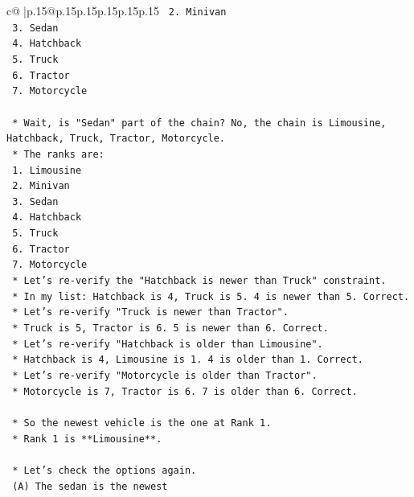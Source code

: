 \documentclass{article}
\begin{document}
{\begin{supertabular}{c@{$\;$}|p{.15\linewidth}@{}p{.15\linewidth}p{.15\linewidth}p{.15\linewidth}p{.15\linewidth}p{.15\linewidth}}
{{{\texttt{        2.  Minivan} \\
\texttt{        3.  Sedan} \\
\texttt{        4.  Hatchback} \\
\texttt{        5.  Truck} \\
\texttt{        6.  Tractor} \\
\texttt{        7.  Motorcycle} \\
\\ 
\texttt{    *   Wait, is "Sedan" part of the chain? No, the chain is Limousine, Hatchback, Truck, Tractor, Motorcycle.} \\
\texttt{    *   The ranks are:} \\
\texttt{        1. Limousine} \\
\texttt{        2. Minivan} \\
\texttt{        3. Sedan} \\
\texttt{        4. Hatchback} \\
\texttt{        5. Truck} \\
\texttt{        6. Tractor} \\
\texttt{        7. Motorcycle} \\
\texttt{    *   Let's re{-}verify the "Hatchback is newer than Truck" constraint.} \\
\texttt{        *   In my list: Hatchback is 4, Truck is 5. 4 is newer than 5. Correct.} \\
\texttt{    *   Let's re{-}verify "Truck is newer than Tractor".} \\
\texttt{        *   Truck is 5, Tractor is 6. 5 is newer than 6. Correct.} \\
\texttt{    *   Let's re{-}verify "Hatchback is older than Limousine".} \\
\texttt{        *   Hatchback is 4, Limousine is 1. 4 is older than 1. Correct.} \\
\texttt{    *   Let's re{-}verify "Motorcycle is older than Tractor".} \\
\texttt{        *   Motorcycle is 7, Tractor is 6. 7 is older than 6. Correct.} \\
\\ 
\texttt{    *   So the newest vehicle is the one at Rank 1.} \\
\texttt{    *   Rank 1 is **Limousine**.} \\
\\ 
\texttt{    *   Let's check the options again.} \\
\texttt{        (A) The sedan is the newest} \\
}}}
\end{supertabular}}
\end{document}
